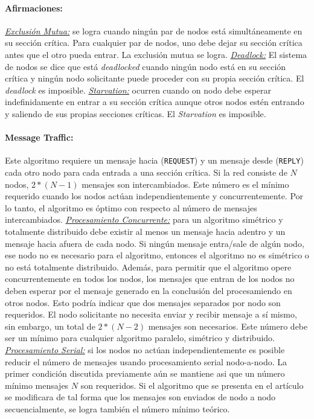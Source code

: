\paragraph{\textnormal{\textbf{Afirmaciones:}}}
\underline{\emph{Exclusión Mutua:}} se logra cuando ningún par de nodos está simultáneamente en su sección crítica. Para cualquier par de nodos, uno debe dejar su sección crítica antes que el otro pueda entrar. La exclusión mutua se logra. \underline{\emph{Deadlock:}} El sistema de nodos se dice que está \emph{deadlocked} cuando ningún nodo está en su sección crítica y ningún nodo solicitante puede proceder con su propia sección crítica. El \emph{deadlock} es imposible. \underline{\emph{Starvation:}} ocurren cuando on nodo debe esperar indefinidamente en entrar a su sección crítica aunque otros nodos estén entrando y saliendo de sus propias secciones críticas. El \emph{Starvation} es imposible.

\paragraph{\textnormal{\textbf{Message Traffic:}}}
Este algoritmo requiere un mensaje hacia (\texttt{REQUEST}) y un mensaje desde (\texttt{REPLY}) cada otro nodo para cada entrada a una sección crítica. Si la red consiste de $N$ nodos, $2 * (N -1)$ mensajes son intercambiados. Este número es el mínimo requerido cuando los nodos actúan independientemente y concurrentemente. Por lo tanto, el algoritmo es óptimo con respecto al número de mensajes intercambiados. \underline{\emph{Procesamiento Concurrente:}} para un algoritmo simétrico y totalmente distribuido debe existir al menos un mensaje hacia adentro y un mensaje hacia afuera de cada nodo. Si ningún mensaje entra/sale de algún nodo, ese nodo no es necesario para el algoritmo, entonces el algoritmo no es simétrico o no está totalmente distribuido. Además, para permitir que el algoritmo opere concurrentemente en todos los nodos, los mensajes que entran de los nodos no deben esperar por el mensaje generado en la conclusión del procesamiendo en otros nodos. Esto podría indicar que dos mensajes separados por nodo son requeridos. El nodo solicitante no necesita enviar y recibir mensaje a sí mismo, sin embargo, un total de $2 * (N - 2)$ mensajes son necesarios. Este número debe ser un mínimo para cualquier algoritmo paralelo, simétrico y distribuido. \underline{\emph{Procesamiento Serial:}} si los nodos no actúan independientemente es posible reducir el número de mensajes usando procesamiento serial nodo-a-nodo. La primer condición discutida previamente aún se mantiene asi que un número mínimo mensajes $N$ son requeridos. Si el algoritmo que se presenta en el artículo se modificara de tal forma que los mensajes son enviados de nodo a nodo secuencialmente, se logra también el número mínimo teórico. 

